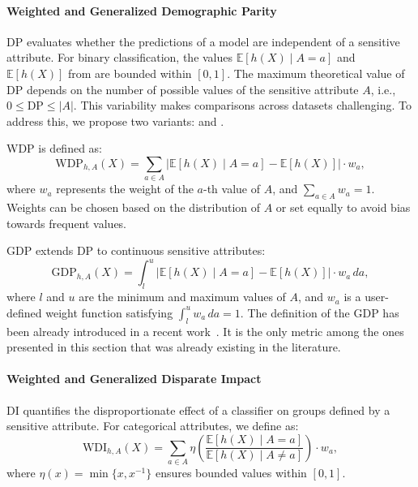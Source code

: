 \paragraph{Weighted and Generalized Demographic Parity}
%
\Gls{DP} evaluates whether the predictions of a model are independent of a sensitive attribute.
%
For binary classification, the values \( \mathbb{E}[h(X) \mid A = a] \) and \( \mathbb{E}[h(X)] \) from  are bounded within \([0, 1]\).
%
The maximum theoretical value of \gls{DP} depends on the number of possible values of the sensitive attribute \( A \), i.e., \( 0 \leq \text{DP} \leq |A| \).
%
This variability makes comparisons across datasets challenging.
%
To address this, we propose two variants:  and .


\Gls{WDP} is defined as:
%
\begin{equation}
    \label{eq:wdp}
    \text{WDP}_{h,A}(X) = \sum_{a \in A} \left| \mathbb{E}[h(X) \mid A = a] - \mathbb{E}[h(X)] \right| \cdot w_a,
\end{equation}
%
where \( w_a \) represents the weight of the \( a \)-th value of \( A \), and \( \sum_{a \in A} w_a = 1 \).
%
Weights can be chosen based on the distribution of \( A \) or set equally to avoid bias towards frequent values.


\Gls{GDP} extends \gls{DP} to continuous sensitive attributes:
%
\begin{equation}
    \label{eq:gdp}
    \text{GDP}_{h,A}(X) = \int_{l}^{u} \left| \mathbb{E}[h(X) \mid A = a] - \mathbb{E}[h(X)] \right| \cdot w_a \, da,
\end{equation}
%
where \( l \) and \( u \) are the minimum and maximum values of \( A \), and \( w_a \) is a user-defined weight function satisfying \( \int_{l}^{u} w_a \, da = 1 \).
%
The definition of the \gls{GDP} has been already introduced in a recent work~\cite{DBLP:conf/iclr/JiangHFYMH22}.
%
It is the only metric among the ones presented in this section that was already existing in the literature.


\paragraph{Weighted and Generalized Disparate Impact}
%
\Gls{DI} quantifies the disproportionate effect of a classifier on groups defined by a sensitive attribute.
%
For categorical attributes, we define  as:
%
\begin{equation}
    \label{eq:wdi}
    \text{WDI}_{h,A}(X) = \sum_{a \in A} \eta \left( \frac{\mathbb{E}[h(X) \mid A = a]}{\mathbb{E}[h(X) \mid A \neq a]} \right) \cdot w_a,
\end{equation}
%
where \( \eta(x) = \min\{x, x^{-1}\} \) ensures bounded values within \([0, 1]\).



